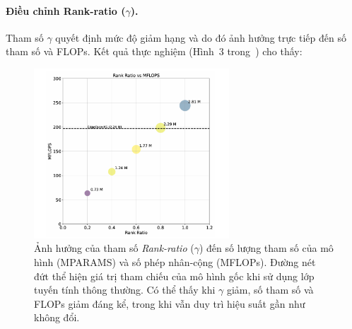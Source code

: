 



\paragraph{Điều chỉnh Rank-ratio ($\gamma$).} 
Tham số $\gamma$ quyết định mức độ giảm hạng và do đó ảnh hưởng trực tiếp đến số tham số và FLOPs. Kết quả thực nghiệm (Hình~3 trong~\cite{george2024edgeface}) cho thấy:
\begin{figure}[ht]
    \centering
    \includegraphics[width=0.65\textwidth]{images/fig3.2.3.png} %
    \caption{Ảnh hưởng của tham số \textit{Rank-ratio} ($\gamma$) đến số lượng tham số của mô hình (MPARAMS) và số phép nhân-cộng (MFLOPs). 
    Đường nét đứt thể hiện giá trị tham chiếu của mô hình gốc khi sử dụng lớp tuyến tính thông thường. 
    Có thể thấy khi $\gamma$ giảm, số tham số và FLOPs giảm đáng kể, trong khi vẫn duy trì hiệu suất gần như không đổi.}
    \label{fig:lora_lin_rank}
    
\end{figure}

